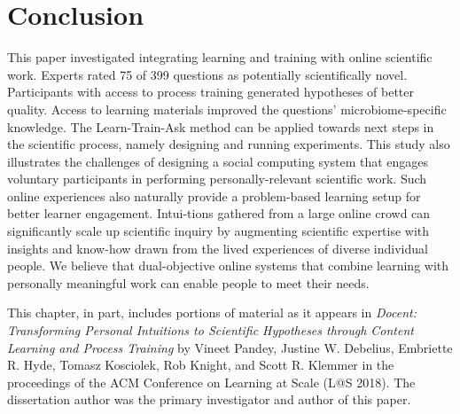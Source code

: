 \section{Conclusion}
This paper investigated integrating learning and training with online scientific work. Experts rated 75 of 399 questions as potentially scientifically novel. Participants with access to process training generated hypotheses of better quality. Access to learning materials improved the questions’ microbiome-specific knowledge.  The Learn-Train-Ask method can be applied towards next steps in the scientific process, namely designing and running experiments. This study also illustrates the challenges of designing a social computing system that engages voluntary participants in performing personally-relevant scientific work. Such online experiences also naturally provide a problem-based learning setup for better learner engagement. Intui-tions gathered from a large online crowd can significantly scale up scientific inquiry by augmenting scientific expertise with insights and know-how drawn from the lived experiences of diverse individual people. We believe that dual-objective online systems that combine learning with personally meaningful work can enable people to meet their needs.

This chapter, in part, includes portions of material as it appears in \emph{Docent: Transforming Personal Intuitions to Scientific Hypotheses through Content Learning and Process Training} by Vineet Pandey, Justine W. Debelius, Embriette R. Hyde, Tomasz Kosciolek, Rob Knight, and Scott R. Klemmer in the proceedings of the ACM Conference on Learning at Scale (L@S 2018). The dissertation author was the primary investigator and author of this paper.

